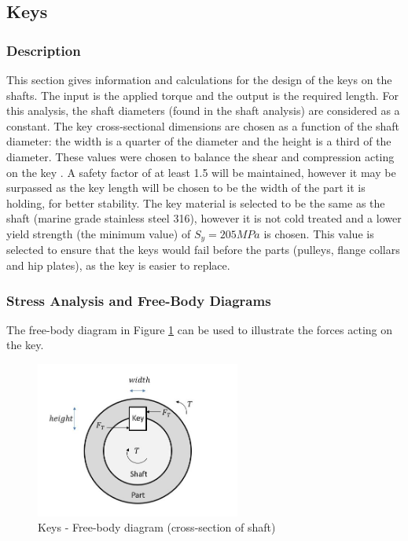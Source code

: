 \subsection{Keys} \label{subsec:keys}

\subsubsection{Description}
This section gives information and calculations for the design of the keys on the shafts. The input is the applied torque and the output is the required length.
For this analysis, the shaft diameters (found in the shaft analysis) are considered as a constant. 
The key cross-sectional dimensions are chosen as a function of the shaft diameter: the width is a quarter of the diameter and the height is a third of the diameter. These values were chosen to balance the shear and compression acting on the key \cite{juvinall_fundamentals_2012}. A safety factor of at least 1.5 will be maintained, however it may be surpassed as the key length will be chosen to be the width of the part it is holding, for better stability.
The key material is selected to be the same as the shaft (marine grade stainless steel 316), however it is not cold treated and a lower yield strength (the minimum value) of $S_y=205 MPa$ is chosen. This value is selected to ensure that the keys would fail before the parts (pulleys, flange collars and hip plates), as the key is easier to replace.

\subsubsection{Stress Analysis and Free-Body Diagrams}
The free-body diagram in Figure \ref{fig:key_fbd} can be used to illustrate the forces acting on the key.

\begin{figure}
    \centering
    \includegraphics[width=0.6\textwidth]{4_Analysis/img/Key/key.JPG}
    \caption{Keys - Free-body diagram (cross-section of shaft)}
    \label{fig:key_fbd}
\end{figure}

